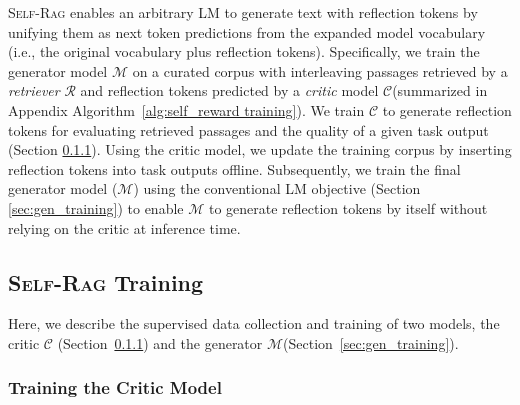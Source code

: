 \documentclass{article} %
\newcommand{\model}{\textsc{Self-Rag}\xspace}
\newcommand{\mgen}{$\mathcal{M}$\xspace}
\newcommand{\mcrt}{$\mathcal{C}$\xspace}
\newcommand{\mret}{$\mathcal{R}$\xspace}
\begin{document}
\model enables an arbitrary LM to generate text with reflection tokens by unifying them as next token predictions from the expanded model vocabulary (i.e., the original vocabulary plus reflection tokens). Specifically, we train the generator model \mgen on a curated corpus with interleaving passages retrieved by a {\it retriever} \mret and reflection tokens predicted by a {\it critic} model \mcrt (summarized in Appendix  Algorithm~\ref{alg:self_reward training}). We train \mcrt to generate reflection tokens for evaluating retrieved passages and the quality of a given task output (Section \ref{sec:critic_trainig}). 
Using the critic model, we update the training corpus by inserting reflection tokens into task outputs offline.  
Subsequently, we train the final generator model (\mgen) using the conventional LM objective (Section \ref{sec:gen_training}) to enable \mgen to generate reflection tokens by itself without relying on the critic at inference time. 

\subsection{\model Training}
Here,  we describe the supervised data collection and training of two models, the critic \mcrt 
(Section~\ref{sec:critic_trainig}) and the generator \mgen (Section~\ref{sec:gen_training}). 




\subsubsection{Training the Critic Model}
\label{sec:critic_trainig}
\end{document}
